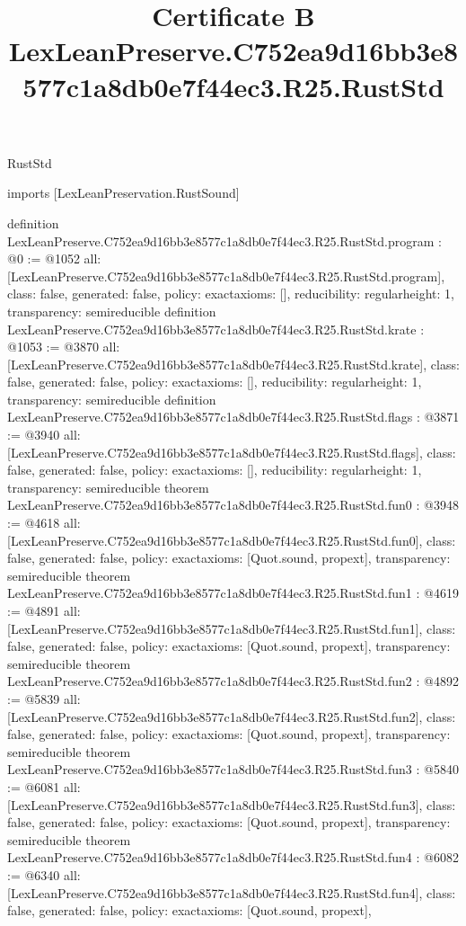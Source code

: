 \begin{lexlean}{RustStd}
\title{Certificate B LexLeanPreserve.C752ea9d16bb3e8577c1a8db0e7f44ec3.R25.RustStd}
\begin{coremodule}
imports [LexLeanPreservation.RustSound]

definition LexLeanPreserve.C752ea9d16bb3e8577c1a8db0e7f44ec3.R25.RustStd.program : @0 := @1052 {
  all: [LexLeanPreserve.C752ea9d16bb3e8577c1a8db0e7f44ec3.R25.RustStd.program],
  class: false,
  generated: false,
  policy: exact{axioms: []},
  reducibility: regular{height: 1},
  transparency: semireducible
}
definition LexLeanPreserve.C752ea9d16bb3e8577c1a8db0e7f44ec3.R25.RustStd.krate : @1053 := @3870 {
  all: [LexLeanPreserve.C752ea9d16bb3e8577c1a8db0e7f44ec3.R25.RustStd.krate],
  class: false,
  generated: false,
  policy: exact{axioms: []},
  reducibility: regular{height: 1},
  transparency: semireducible
}
definition LexLeanPreserve.C752ea9d16bb3e8577c1a8db0e7f44ec3.R25.RustStd.flags : @3871 := @3940 {
  all: [LexLeanPreserve.C752ea9d16bb3e8577c1a8db0e7f44ec3.R25.RustStd.flags],
  class: false,
  generated: false,
  policy: exact{axioms: []},
  reducibility: regular{height: 1},
  transparency: semireducible
}
theorem LexLeanPreserve.C752ea9d16bb3e8577c1a8db0e7f44ec3.R25.RustStd.fun0 : @3948 := @4618 {
  all: [LexLeanPreserve.C752ea9d16bb3e8577c1a8db0e7f44ec3.R25.RustStd.fun0],
  class: false,
  generated: false,
  policy: exact{axioms: [Quot.sound, propext]},
  transparency: semireducible
}
theorem LexLeanPreserve.C752ea9d16bb3e8577c1a8db0e7f44ec3.R25.RustStd.fun1 : @4619 := @4891 {
  all: [LexLeanPreserve.C752ea9d16bb3e8577c1a8db0e7f44ec3.R25.RustStd.fun1],
  class: false,
  generated: false,
  policy: exact{axioms: [Quot.sound, propext]},
  transparency: semireducible
}
theorem LexLeanPreserve.C752ea9d16bb3e8577c1a8db0e7f44ec3.R25.RustStd.fun2 : @4892 := @5839 {
  all: [LexLeanPreserve.C752ea9d16bb3e8577c1a8db0e7f44ec3.R25.RustStd.fun2],
  class: false,
  generated: false,
  policy: exact{axioms: [Quot.sound, propext]},
  transparency: semireducible
}
theorem LexLeanPreserve.C752ea9d16bb3e8577c1a8db0e7f44ec3.R25.RustStd.fun3 : @5840 := @6081 {
  all: [LexLeanPreserve.C752ea9d16bb3e8577c1a8db0e7f44ec3.R25.RustStd.fun3],
  class: false,
  generated: false,
  policy: exact{axioms: [Quot.sound, propext]},
  transparency: semireducible
}
theorem LexLeanPreserve.C752ea9d16bb3e8577c1a8db0e7f44ec3.R25.RustStd.fun4 : @6082 := @6340 {
  all: [LexLeanPreserve.C752ea9d16bb3e8577c1a8db0e7f44ec3.R25.RustStd.fun4],
  class: false,
  generated: false,
  policy: exact{axioms: [Quot.sound, propext]},
}
\end{coremodule}
\end{lexlean}
